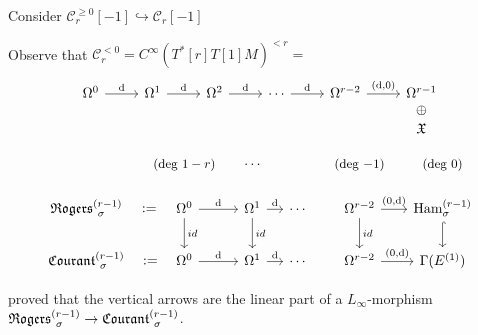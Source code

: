 \documentclass[beamer,10pt]{standalone}
\begin{document}

\begin{frame}
	Consider $\mathcal{C}_r^{\geq 0}[-1] \hookrightarrow \mathcal{C}_r[-1]$
	\vfill

	Observe that $\mathcal{C}_r^{<0} = C^\infty(T^*[r]T[1]M)^{<r}=$
	\begin{displaymath}
		\begin{tikzcd}[ampersand replacement=\&]
			\Omega^0 \ar[r,"\d"]\&
			\Omega^1 \ar[r,"\d"]\&
			\Omega^2 \ar[r,"\d"]\&
			\cdots \ar[r,"\d"]\&
			\Omega^{r-2} \ar[r,"{(\d,0)}"]\&
			\Omega^{r-1}\ar[d,phantom,"\oplus"]\\[-.7em]
			\&\&\&\&\&\X
 		\end{tikzcd}
	\end{displaymath}
	\vfill

	\begin{displaymath}
		\begin{tikzcd}[ampersand replacement=\&,column sep = small]
			\& \text{\small (deg $1-r$)} \& \cdots \& \&\text{\small (deg $-1$)} \& \text{\small (deg $0$)} \\[-.5em]
			\Rogers[\sigma]{r-1}   \ar[r,phantom,":="]
			\&
			\Omega^0 \ar[r,"{\d}"] \ar[d,"id"]
			\&
			\Omega^1 \ar[r,"{\d}"] \ar[d,"id"]
			\&
			\cdots
			\&
			\Omega^{r-2} \ar[r,"{(0,\d)}"] \ar[d,"id"]
			\& \Ham_{\sigma}^{(r-1)} \ar[d,hook]
			\\
			\Courant[\sigma]{r-1} \ar[r,phantom,":="]
			\&
			\Omega^0 \ar[r,"{\d}"]
			\&
			\Omega^1 \ar[r,"{\d}"] 
			\&
			\cdots
			\&
			\Omega^{r-2} \ar[r,"{(0,\d)}"]
			\& \Gamma(E^{(1)})
		\end{tikzcd}
	\end{displaymath}
	\vfill

	\cite{Miti2021} proved that the vertical arrows are the linear part of a $L_\infty$-morphism $\Rogers[\sigma]{r-1} \to \Courant[\sigma]{r-1}$.
\end{frame}
\end{document}
